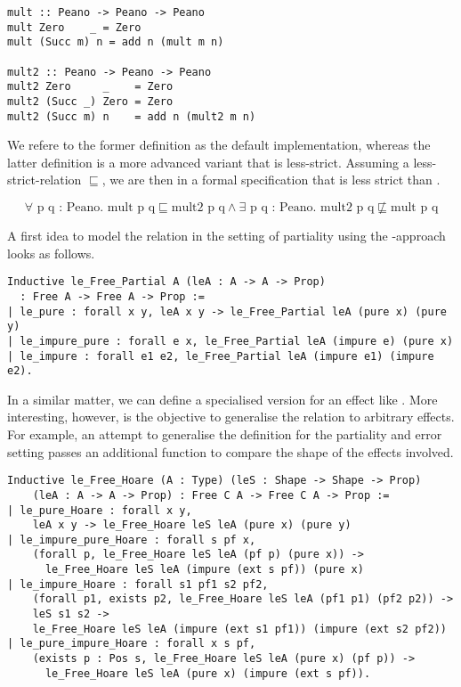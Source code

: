 \begin{verbatim}
mult :: Peano -> Peano -> Peano
mult Zero    _ = Zero
mult (Succ m) n = add n (mult m n)

mult2 :: Peano -> Peano -> Peano
mult2 Zero     _    = Zero
mult2 (Succ _) Zero = Zero
mult2 (Succ m) n    = add n (mult2 m n)
\end{verbatim}

We refere to the former definition as the default implementation, whereas the latter definition is a more advanced variant that is less-strict.
Assuming a less-strict-relation $\sqsubseteq$, we are then  in a formal specification that  is less strict than .

\[
\forall \text{ p q : Peano}. \text{ mult p q} \sqsubseteq \text{mult2
  p q} \wedge \exists \text{ p q : Peano}. \text{ mult2 p q} \not \sqsubseteq \text{mult p q}
\]

A first idea to model the relation in the setting of partiality using the -approach looks as follows.

\begin{verbatim}
Inductive le_Free_Partial A (leA : A -> A -> Prop)
  : Free A -> Free A -> Prop :=
| le_pure : forall x y, leA x y -> le_Free_Partial leA (pure x) (pure y)
| le_impure_pure : forall e x, le_Free_Partial leA (impure e) (pure x)
| le_impure : forall e1 e2, le_Free_Partial leA (impure e1) (impure e2).
\end{verbatim}

In a similar matter, we can define a specialised version for an effect like .
More interesting, however, is the objective to generalise the relation to arbitrary effects.
For example, an attempt to generalise the definition for the partiality and error setting passes an additional function to compare the shape of the effects involved.

\begin{verbatim}
Inductive le_Free_Hoare (A : Type) (leS : Shape -> Shape -> Prop)
    (leA : A -> A -> Prop) : Free C A -> Free C A -> Prop :=
| le_pure_Hoare : forall x y,
    leA x y -> le_Free_Hoare leS leA (pure x) (pure y)
| le_impure_pure_Hoare : forall s pf x,
    (forall p, le_Free_Hoare leS leA (pf p) (pure x)) ->
      le_Free_Hoare leS leA (impure (ext s pf)) (pure x)
| le_impure_Hoare : forall s1 pf1 s2 pf2,
    (forall p1, exists p2, le_Free_Hoare leS leA (pf1 p1) (pf2 p2)) ->
    leS s1 s2 ->
    le_Free_Hoare leS leA (impure (ext s1 pf1)) (impure (ext s2 pf2))
| le_pure_impure_Hoare : forall x s pf,
    (exists p : Pos s, le_Free_Hoare leS leA (pure x) (pf p)) ->
      le_Free_Hoare leS leA (pure x) (impure (ext s pf)).
\end{verbatim}


